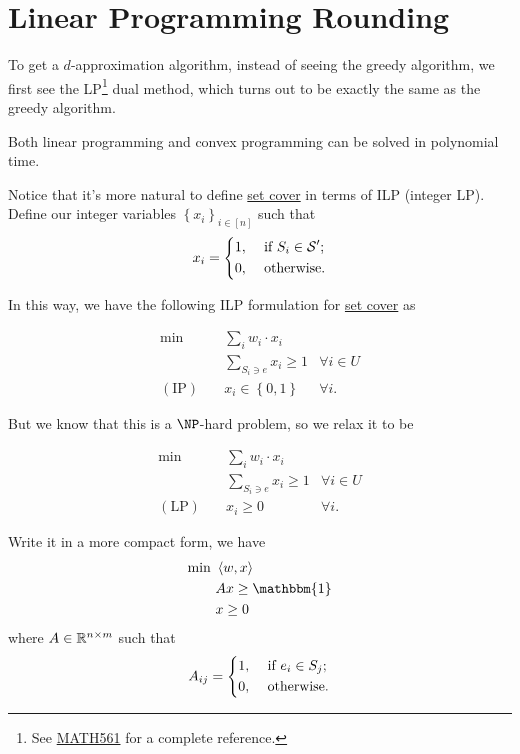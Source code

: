 \section{Linear Programming Rounding}
To get a \(d\)-approximation algorithm, instead of seeing the greedy algorithm, we first see the LP\footnote{See \href{https://www.pbb.wtf/posts/Notes\#linear-programming-math561ioe510to518-umich}{MATH561} for a complete reference.} dual method, which turns out to be exactly the same as the greedy algorithm.

\begin{prev}
	Both linear programming and convex programming can be solved in polynomial time.
\end{prev}

Notice that it's more natural to define \hyperref[prb:set-cover]{set cover} in terms of ILP (integer LP). Define our integer variables \(\left\{ x_i \right\} _{i\in [n]}\) such that
\[
	x_i = \begin{dcases}
		1, & \text{ if } S_i\in \mathcal{\MakeUppercase{S}} ^\prime  ; \\
		0, & \text{ otherwise}.
	\end{dcases}
\]

In this way, we have the following ILP formulation for \hyperref[prb:set-cover]{set cover} as

\[
	\begin{aligned}
		\min~            & \sum_{i} w_i \cdot x_i                           \\
		                 & \sum_{S_i\ni e}x_{i} \geq 1     & \forall i\in U \\
		(\text{IP})\quad & x_{i} \in \left\{ 0, 1 \right\} & \forall i.
	\end{aligned}
\]

But we know that this is a \(\NP\)-hard problem, so we relax it to be

\[
	\begin{aligned}
		\min~            & \sum_{i} w_i \cdot x_i                       \\
		                 & \sum_{S_i\ni e}x_{i} \geq 1 & \forall i\in U \\
		(\text{LP})\quad & x_{i} \geq 0                & \forall i.
	\end{aligned}
\]

Write it in a more compact form, we have
\[
	\begin{aligned}
		\min~ & \left\langle w, x \right\rangle \\
		      & Ax \geq \mathbbm{1}             \\
		      & x\geq 0
	\end{aligned}
\]
where \(A\in \mathbb{\MakeUppercase{r}} ^{n\times m}\) such that
\[
	A_{ij} = \begin{dcases}
		1, & \text{ if } e_i\in S_j ; \\
		0, & \text{ otherwise}.
	\end{dcases}
\]

